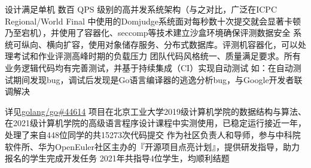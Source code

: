 \documentclass{ctexrep}
\begin{document}
\begin{outline}
    \1 设计满足单机 数百 QPS 级别的高并发系统架构（与之对比，广泛在ICPC  Regional/World Final 中使用的Domjudge系统面对每秒数十次提交就会显著卡顿乃至宕机），并使用了容器化、seccomp等技术建立沙盒环境确保评测数据安全
    \1 系统可纵向、横向扩容，使用对象储存服务、分布式数据库。评测机容器化，可以处理考试和作业评测高峰时期的负载压力
    \1 团队代码风格统一、质量满足要求。所有业务逻辑代码均有完善测试，并基于持续集成（CI）实现自动测试
        \2 如：在自动测试期间发现bug，调试后发现是Go语言编译器的逃逸分析bug，与Google开发者联调解决
        
            详见\href{https://github.com/golang/go/issues/44614}{golang/go\#44614}
    \1 项目在北京工业大学2019级计算机学院的数据结构与算法、在2021级计算机学院的高级语言程序设计课程中实测使用，已稳定运行接近一年，处理了来自448位同学的共15273次代码提交
    \1 作为社区负责人和导师，参与中科院软件所、华为OpenEuler社区主办的『开源项目点亮计划』，提供研发指导，助力报名的学生完成开发任务
        \2 2021年共指导4位学生，均顺利结题
\end{outline}
\end{document}
